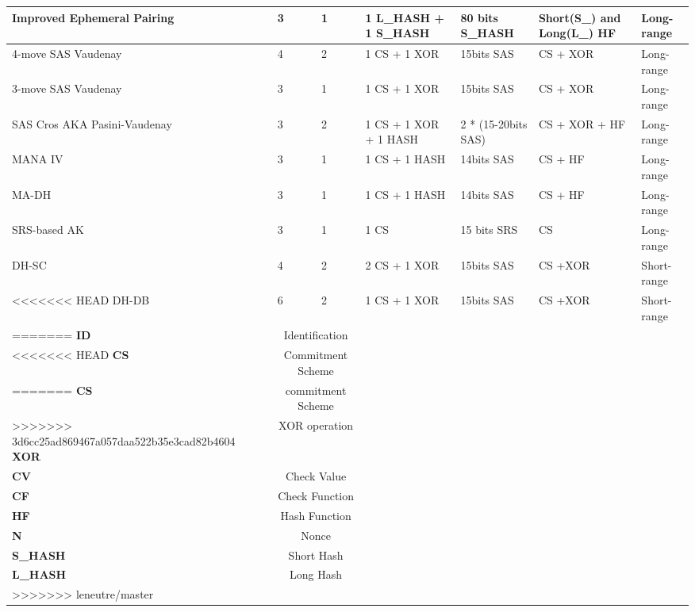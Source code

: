 \begin{enumerate}
\begin{enumerate}
\begin{table}[ht]
{\begin{tabular}{ | p{2cm} | p{1.4cm} | p{1.4cm} | p{2cm} | p{2.2cm} | p{2cm} | p{2cm}| }
Improved	Ephemeral Pairing & 3 &	 1 &	 1 L\_HASH + 1 S\_HASH &	80 bits S\_HASH & Short(S\_) and Long(L\_) HF & Long-range \\ \hline 
 
4-move SAS Vaudenay & 4	& 2 & 1 CS + 1 XOR & 15bits SAS	& CS + XOR & Long-range\\ \hline 

3-move SAS Vaudenay & 3	& 1 & 1 CS + 1 XOR & 15bits SAS	& CS + XOR & Long-range\\ \hline 
 																				
SAS Cros AKA Pasini-Vaudenay &	3 &	2 &	1 CS + 1 XOR + 1 HASH & 2 * (15-20bits SAS) & CS + XOR + HF & Long-range\\ \hline 

MANA IV & 3 & 1 & 1 CS + 1 HASH & 14bits SAS & CS + HF & Long-range\\ \hline 

MA-DH & 3 &	1 &	1 CS + 1 HASH & 14bits SAS & CS + HF & Long-range \\ \hline 

 SRS-based AK & 3 & 1 &  1 CS &	 15 bits SRS &	 CS & Long-range \\\hline 

DH-SC & 4 &	2 &	2 CS + 1 XOR & 15bits SAS & CS +XOR & Short-range\\ \hline 

<<<<<<< HEAD
DH-DB & 6 &	2 &	1 CS + 1 XOR & 15bits SAS & CS +XOR & Short-range\\ \hline 
=======
\textbf{ID} &\multicolumn{2}{c}{Identification} & & & & \\
<<<<<<< HEAD
\textbf{CS} &\multicolumn{2}{c}{Commitment Scheme} & & & & \\
=======
\textbf{CS} &\multicolumn{2}{c}{commitment Scheme} & & & & \\
>>>>>>> 3d6cc25ad869467a057daa522b35e3cad82b4604
\textbf{XOR} &\multicolumn{2}{c}{XOR operation} & & & & \\
\textbf{CV} &\multicolumn{2}{c}{Check Value} & & & & \\
\textbf{CF} &\multicolumn{2}{c}{Check Function} & & & & \\
\textbf{HF} &\multicolumn{2}{c}{Hash Function} & & & & \\
\textbf{N} &\multicolumn{2}{c}{Nonce} & & & & \\
\textbf{S\_HASH} &\multicolumn{2}{c}{Short Hash} & & & & \\
\textbf{L\_HASH} &\multicolumn{2}{c}{Long Hash} & & & & \\ \hline
>>>>>>> leneutre/master
\end{tabular}
}
\end{table}


\end{enumerate}
\end{enumerate}
